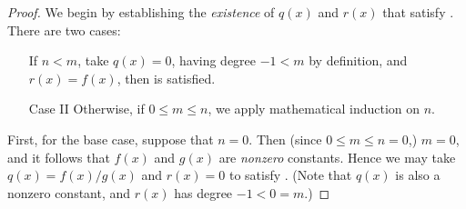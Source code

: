 \begin{proof}
We begin by establishing the \emph{existence} of \(q(x)\) and \(r(x)\) that satisfy .
There are two cases:
\begin{enumerate}
\item[\BLUE{Case I}] If \(n < m\), take \(q(x) = 0\), having degree \(-1 < m\) by definition, and \(r(x) = f(x)\), then  is satisfied.
\item[Case II] Otherwise, if \(0 \le m \le n\), we apply mathematical induction on \(n\).
\end{enumerate}

First, for the base case, suppose that \(n = 0\).
Then (since \(0 \le m \le n = 0\),) \(m = 0\), and it follows that \(f(x)\) and \(g(x)\) are \emph{nonzero} constants.
Hence we may take \(q(x) = f(x)/g(x)\) and \(r(x) = 0\) to satisfy .
(Note that \(q(x)\) is also a nonzero constant, and \(r(x)\) has degree \(-1 < 0 = m\).)


\end{proof}
